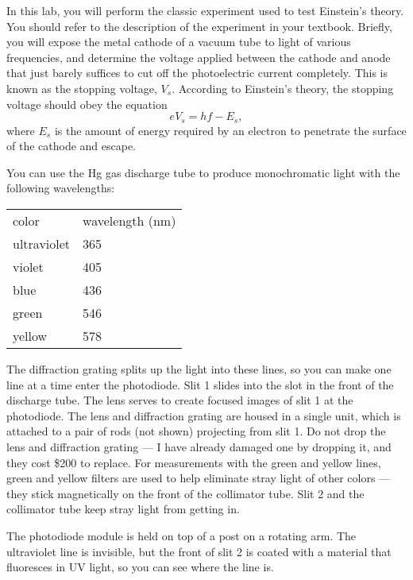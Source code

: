 In this lab, you will perform the classic experiment used to
test Einstein's theory. You should refer to the description
of the experiment in your textbook. Briefly, you will expose
the metal cathode of a vacuum tube to light of various
frequencies, and determine the voltage applied between the
cathode and anode that just barely suffices to cut off the
photoelectric current completely. This is known as the
stopping voltage, $V_s$. According to Einstein's theory, the
stopping voltage should obey the equation
\begin{equation*}
         e V_s  =  hf - E_s   ,  
\end{equation*}
where $E_s$ is the amount of energy
required by an electron to penetrate the surface of
the cathode and escape.


\setup

You can use the Hg gas discharge tube to produce monochromatic
light with the following wavelengths:\label{hg-wavelengths}

\begin{tabular}{ll}
color   &wavelength (nm)\\
ultraviolet &  365\\
violet   &405\\
blue   &436\\
green  & 546\\
yellow  & 578
\end{tabular}

The diffraction grating splits up the light into these
lines, so you can make one line at a time enter the
photodiode. Slit 1 slides into the slot in the front of the
discharge tube. The lens serves to create focused images of slit 1 at
the photodiode.  The lens and diffraction grating are housed
in a single unit, which is attached to a pair of rods (not
shown) projecting from slit 1. Do not drop the lens and
diffraction grating --- I have already damaged one by
dropping it, and they cost \$200 to replace. For measurements
with the green and yellow lines, green and yellow filters
are used to help eliminate stray light of other colors ---
they stick magnetically on the front of the collimator tube.
Slit 2 and the collimator tube keep stray light from getting in.

The photodiode module is held on top of a post on a rotating
arm.  The ultraviolet line is invisible, but the front of
slit 2 is coated with a material that fluoresces in UV
light, so you can see where the line is.

